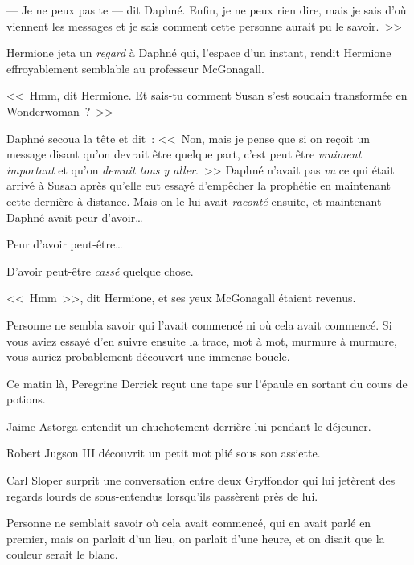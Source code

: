 --- Je ne peux pas te — dit Daphné. Enfin, je ne peux rien dire, mais je sais d'où viennent les messages et je sais comment cette personne aurait pu le savoir.~>>

Hermione jeta un \emph{regard} à Daphné qui, l'espace d'un instant, rendit Hermione effroyablement semblable au professeur McGonagall.

<<~Hmm, dit Hermione. Et sais-tu comment Susan s'est soudain transformée en Wonderwoman~?~>>

Daphné secoua la tête et dit~: <<~Non, mais je pense que si on reçoit un message disant qu'on devrait être quelque part, c'est peut être \emph{vraiment important} et qu'on \emph{devrait tous y aller}.~>> Daphné n'avait pas \emph{vu} ce qui était arrivé à Susan après qu'elle eut essayé d'empêcher la prophétie en maintenant cette dernière à distance. Mais on le lui avait \emph{raconté} ensuite, et maintenant Daphné avait peur d'avoir…

Peur d'avoir peut-être…

D'avoir peut-être \emph{cassé} quelque chose.

<<~Hmm~>>, dit Hermione, et ses yeux McGonagall étaient revenus.

\later

Personne ne sembla savoir qui l'avait commencé ni où cela avait commencé. Si vous aviez essayé d'en suivre ensuite la trace, mot à mot, murmure à murmure, vous auriez probablement découvert une immense boucle.

Ce matin là, Peregrine Derrick reçut une tape sur l'épaule en sortant du cours de potions.

Jaime Astorga entendit un chuchotement derrière lui pendant le déjeuner.

Robert Jugson III découvrit un petit mot plié sous son assiette.

Carl Sloper surprit une conversation entre deux Gryffondor qui lui jetèrent des regards lourds de sous-entendus lorsqu'ils passèrent près de lui.

Personne ne semblait savoir où cela avait commencé, qui en avait parlé en premier, mais on parlait d'un lieu, on parlait d'une heure, et on disait que la couleur serait le blanc.

\later

